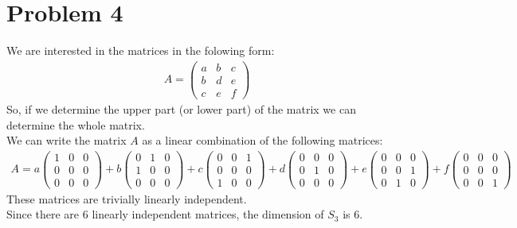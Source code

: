 \documentclass{article}
\begin{document}
\section*{Problem 4}
We are interested in the matrices in the folowing form:
\begin{align*}
   A = \begin{pmatrix}
      a & b & c \\
      b & d & e \\
      c & e & f
   \end{pmatrix}
\end{align*}
So, if we determine the upper part (or lower part) of the matrix we can determine the whole matrix. \\
We can write the matrix \(A\) as a linear combination of the following matrices:
\begin{align*}
   A = a \begin{pmatrix}
      1 & 0 & 0 \\
      0 & 0 & 0 \\
      0 & 0 & 0
   \end{pmatrix} + b \begin{pmatrix}
      0 & 1 & 0 \\
      1 & 0 & 0 \\
      0 & 0 & 0
   \end{pmatrix} + c \begin{pmatrix}
      0 & 0 & 1 \\
      0 & 0 & 0 \\
      1 & 0 & 0
   \end{pmatrix} + d \begin{pmatrix}
      0 & 0 & 0 \\
      0 & 1 & 0 \\
      0 & 0 & 0
   \end{pmatrix} + e \begin{pmatrix}
      0 & 0 & 0 \\
      0 & 0 & 1 \\
      0 & 1 & 0
   \end{pmatrix} + f \begin{pmatrix}
      0 & 0 & 0 \\
      0 & 0 & 0 \\
      0 & 0 & 1
   \end{pmatrix}
\end{align*}
These matrices are trivially linearly independent. \\
Since there are 6 linearly independent matrices, the dimension of \(S_3\) is 6. \\
\end{document}
